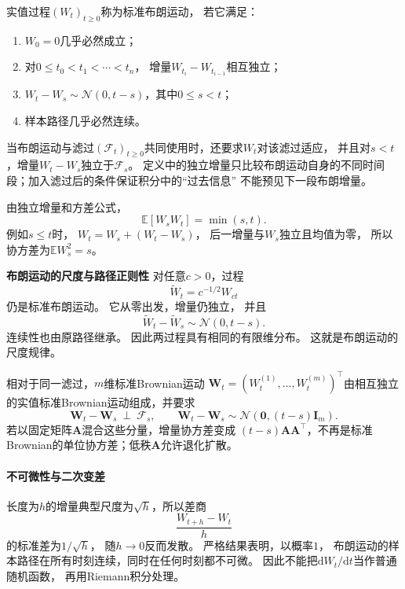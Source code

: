 \begin{definition}[标准布朗运动]
	\label{def:dynamical-standard-brownian-motion} 实值过程$(W_{t})_{t\geq0}$称为标准布朗运动，
	若它满足：
	\begin{enumerate}
		\item $W_{0}=0$几乎必然成立；

		\item 对$0\leq t_{0}<t_{1}<\cdots<t_{n}$， 增量$W_{t_i}-W_{t_{i-1}}$相互独立；

		\item $W_{t}-W_{s}\sim\mathcal{N}(0,t-s)$，其中$0\leq s<t$；

		\item 样本路径几乎必然连续。
	\end{enumerate}
\end{definition}

当布朗运动与滤过$(\mathcal{F}_t)_{t\geq0}$共同使用时，还要求$W_t$对该滤过适应，
并且对$s<t$，增量$W_t-W_s$独立于$\mathcal{F}_s$。
定义中的独立增量只比较布朗运动自身的不同时间段；加入滤过后的条件保证积分中的“过去信息”
不能预见下一段布朗增量。

由独立增量和方差公式，
\begin{equation}
	\mathbb{E}[W_{s}W_{t}]=\min(s,t). \label{eq:dynamical-brownian-covariance}
\end{equation}
例如$s\leq t$时， $W_{t}=W_{s}+(W_{t}-W_{s})$， 后一增量与$W_{s}$独立且均值为零，
所以协方差为$\mathbb{E}W_{s}^{2}=s$。

\par\medskip\noindent\textbf{布朗运动的尺度与路径正则性}\quad
对任意$c>0$，过程
\[
	\widetilde W_{t}= c^{-1/2}W_{ct}
\]
仍是标准布朗运动。 它从零出发，增量仍独立， 并且
\[
	\widetilde W_{t}-\widetilde W_{s}\sim \mathcal{N}(0,t-s).
\]
连续性也由原路径继承。 因此两过程具有相同的有限维分布。
这就是布朗运动的尺度规律。

相对于同一滤过，\(m\)维标准Brownian运动
\(\bm W_t=(W_t^{(1)},\ldots,W_t^{(m)})^\top\)由相互独立的实值标准Brownian运动组成，并要求
\[
\bm W_t-\bm W_s\ \perp\ \mathcal F_s,\qquad
\bm W_t-\bm W_s\sim\mathcal N(\bm0,(t-s)\bm I_m).
\]
若以固定矩阵\(\bm A\)混合这些分量，增量协方差变成
\((t-s)\bm A\bm A^\top\)，不再是标准Brownian的单位协方差；低秩\(\bm A\)允许退化扩散。

\paragraph{不可微性与二次变差}
长度为\(h\)的增量典型尺度为\(\sqrt h\)，所以差商
\[
	\frac{W_{t+h}-W_{t}}{h}
\]
的标准差为$1/\sqrt{h}$， 随$h\to0$反而发散。 严格结果表明，以概率$1$，
布朗运动的样本路径在所有时刻连续，同时在任何时刻都不可微。
因此不能把$\mathrm{d}W_{t}/\mathrm{d}t$当作普通随机函数， 再用Riemann积分处理。

